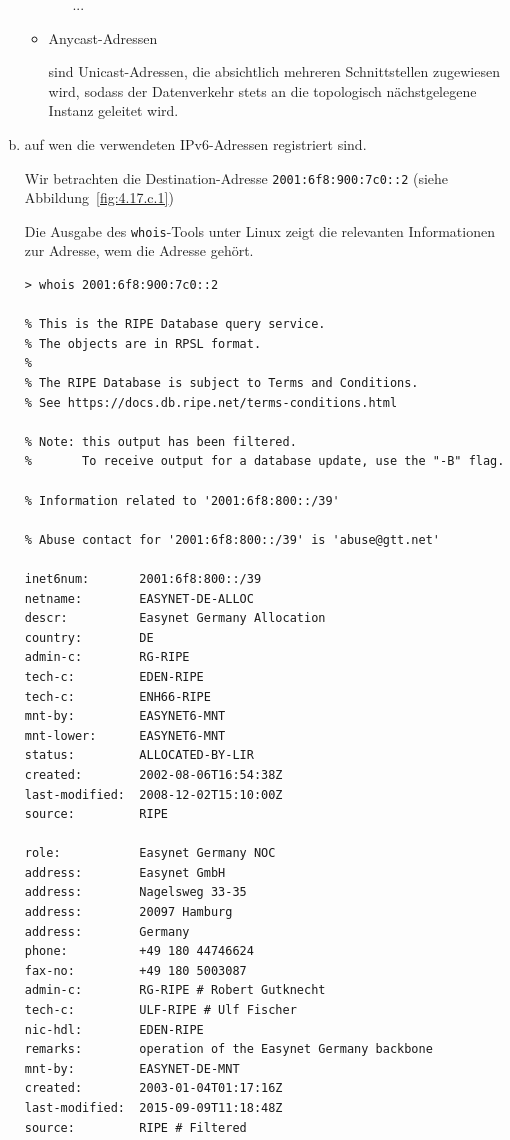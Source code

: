 \begin{enumerate}[(a)]
\begin{itemize}
\begin{itemize}
                        ...
                \end{itemize}
            \item Anycast-Adressen

                sind Unicast-Adressen, die absichtlich mehreren
                Schnittstellen zugewiesen wird, sodass der Datenverkehr stets
                an die topologisch nächstgelegene Instanz geleitet wird.
        \end{itemize}

    \item auf wen die verwendeten IPv6-Adressen registriert sind.

        Wir betrachten die Destination-Adresse \verb|2001:6f8:900:7c0::2| (siehe Abbildung~\ref{fig:4.17.c.1})

        Die Ausgabe des \verb|whois|-Tools unter Linux zeigt die relevanten
        Informationen zur Adresse, wem die Adresse gehört.

\begin{verbatim}
> whois 2001:6f8:900:7c0::2

% This is the RIPE Database query service.
% The objects are in RPSL format.
%
% The RIPE Database is subject to Terms and Conditions.
% See https://docs.db.ripe.net/terms-conditions.html

% Note: this output has been filtered.
%       To receive output for a database update, use the "-B" flag.

% Information related to '2001:6f8:800::/39'

% Abuse contact for '2001:6f8:800::/39' is 'abuse@gtt.net'

inet6num:       2001:6f8:800::/39
netname:        EASYNET-DE-ALLOC
descr:          Easynet Germany Allocation
country:        DE
admin-c:        RG-RIPE
tech-c:         EDEN-RIPE
tech-c:         ENH66-RIPE
mnt-by:         EASYNET6-MNT
mnt-lower:      EASYNET6-MNT
status:         ALLOCATED-BY-LIR
created:        2002-08-06T16:54:38Z
last-modified:  2008-12-02T15:10:00Z
source:         RIPE

role:           Easynet Germany NOC
address:        Easynet GmbH
address:        Nagelsweg 33-35
address:        20097 Hamburg
address:        Germany
phone:          +49 180 44746624
fax-no:         +49 180 5003087
admin-c:        RG-RIPE # Robert Gutknecht
tech-c:         ULF-RIPE # Ulf Fischer
nic-hdl:        EDEN-RIPE
remarks:        operation of the Easynet Germany backbone
mnt-by:         EASYNET-DE-MNT
created:        2003-01-04T01:17:16Z
last-modified:  2015-09-09T11:18:48Z
source:         RIPE # Filtered


\end{verbatim}
\end{enumerate}
